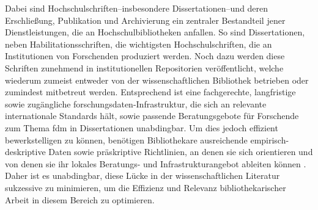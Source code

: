 Dabei sind Hochschulschriften--insbesondere Dissertationen--und deren Erschließung, Publikation und Archivierung ein zentraler Bestandteil jener Dienstleistungen, die an Hochschulbibliotheken anfallen.
So sind Dissertationen, neben Habilitationsschriften, die wichtigsten Hochschulschriften, die an Institutionen von Forschenden produziert werden.
Noch dazu werden diese Schriften zunehmend in institutionellen Repositorien veröffentlicht, welche wiederum zumeist entweder von der wissenschaftlichen Bibliothek betrieben oder zumindest mitbetreut werden.
Entsprechend ist eine fachgerechte, langfristige sowie zugängliche \gls{forschungsdaten}-Infrastruktur, die sich an relevante internationale Standards hält, sowie passende Beratungsgebote für Forschende zum Thema \gls{fdm} in Dissertationen unabdingbar.
Um dies jedoch effizient bewerkstelligen zu können, benötigen Bibliothekare ausreichende empirisch-deskriptive Daten sowie präskriptive Richtlinien, an denen sie sich orientieren und von denen sie ihr lokales Beratungs- und Infrastrukturangebot ableiten können \autocite{Martin2013Wissenschaftliche}.
Daher ist es unabdingbar, diese Lücke in der wissenschaftlichen Literatur sukzessive zu minimieren, um die Effizienz und Relevanz bibliothekarischer Arbeit in diesem Bereich zu optimieren.

